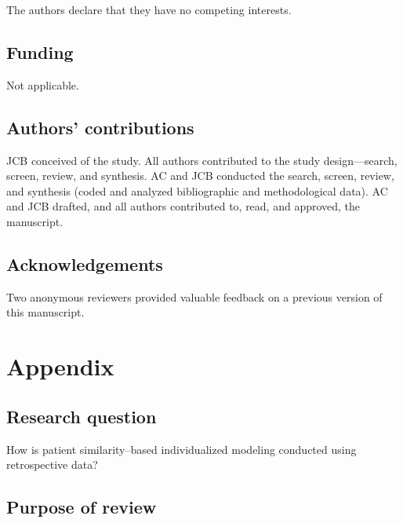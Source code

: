 \documentclass[sn-mathphys,Numbered,pdflatex]{sn-jnl}
\theoremstyle{remark}
\theoremstyle{definition}
\begin{document}
The authors declare that they have no competing interests.

\subsection*{Funding}\label{funding}

Not applicable.

\subsection*{Authors' contributions}\label{authors-contributions}

JCB conceived of the study. All authors contributed to the study
design---search, screen, review, and synthesis. AC and JCB conducted the
search, screen, review, and synthesis (coded and analyzed bibliographic
and methodological data). AC and JCB drafted, and all authors
contributed to, read, and approved, the manuscript.

\subsection*{Acknowledgements}\label{acknowledgements}

Two anonymous reviewers provided valuable feedback on a previous version
of this manuscript.

\pagebreak

\section*{Appendix}\label{appendix}

\subsection*{Research question}\label{research-question}

How is patient similarity--based individualized modeling conducted using
retrospective data?

\subsection*{Purpose of review}\label{purpose-of-review}
\end{document}
